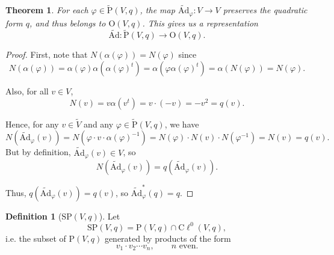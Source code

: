 \documentclass[a4paper,10pt]{scrreprt}
\newcommand{\cliff}{\mathrm{C}\ell}
\newcommand{\tAd}{\widetilde{\mathrm{Ad}}}
\newcommand{\Or}{\mathrm{O}}
\newcommand{\tP}{\tilde{\mathrm{P}}}
\newcommand{\SP}{\mathrm{SP}}
\theoremstyle{definition}
\newtheorem{definition}{Definition}[section]
\theoremstyle{plain}
\newtheorem{theorem}{Theorem}[section]
\theoremstyle{remark}
\begin{document}
\begin{theorem}
  For each $\varphi \in \tP(V, q)$, the map $\tAd_{\varphi}\colon V \to V$ preserves the quadratic form $q$, and thus belongs to $\Or(V, q)$. This gives us a representation
  \begin{equation*}
    \tAd\colon \tP(V, q) \to \Or(V, q).
  \end{equation*}
\end{theorem}
\begin{proof}
  First, note that $N(\alpha(\varphi)) = N(\varphi)$ since
  \begin{equation*}
    N(\alpha(\varphi)) = \alpha(\varphi) \alpha(\alpha(\varphi)^{t}) = \alpha(\varphi \alpha (\varphi)^{t}) = \alpha(N(\varphi)) = N(\varphi).
  \end{equation*}

  Also, for all $v \in V$, 
  \begin{equation*}
    N(v) = v \alpha(v^{t}) = v\cdot(-v) = -v^2 = q(v).
  \end{equation*}

  Hence, for any $v \in \tilde{V}$ and any $\varphi \in \tP(V, q)$, we have
  \begin{equation*}
    N(\tAd_{\varphi}(v)) = N(\varphi\cdot v\cdot \alpha(\varphi)^{-1}) = N(\varphi)\cdot N(v) \cdot N(\varphi^{-1}) = N(v) = q(v).
  \end{equation*}
  But by definition, $\tAd_{\varphi}(v) \in V$, so
  \begin{equation*}
    N(\tAd_{\varphi}(v)) = q(\tAd_{\varphi}(v)).
  \end{equation*}

  Thus, $q(\tAd_{\varphi}(v)) = q(v)$, so $\tAd_{\varphi}^{*}(q) = q$.
\end{proof}

\begin{definition}[$\SP(V, q)$]
  \label{def:spgroup}
  Let 
  \begin{equation*}
    \SP(V, q) = \mathrm{P}(V, q) \cap \cliff^{0}(V, q),
  \end{equation*}
  i.e. the subset of $\mathrm{P}(V, q)$ generated by products of the form
  \begin{equation*}
    v_{1} \cdot v_{2} \cdots v_{n},\qquad n\text{ even}.
  \end{equation*}
\end{definition}
\end{document}
